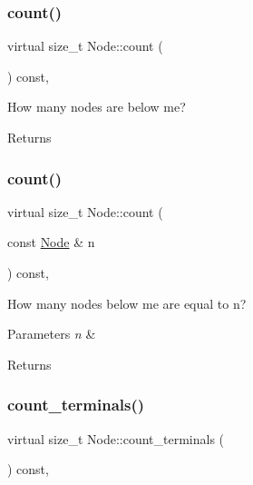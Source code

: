 \subsubsection{\texorpdfstring{count()}{count()}\hspace{0.1cm}{\footnotesize\ttfamily [1/2]}}
{\footnotesize\ttfamily virtual size\+\_\+t Node\+::count (\begin{DoxyParamCaption}{ }\end{DoxyParamCaption}) const\hspace{0.3cm}{\ttfamily [inline]}, {\ttfamily [virtual]}}

How many nodes are below me? \begin{DoxyReturn}{Returns}

\end{DoxyReturn}
\mbox{\label{class_node_a0cc58478d98361566830a8d3db745718}} 
\subsubsection{\texorpdfstring{count()}{count()}\hspace{0.1cm}{\footnotesize\ttfamily [2/2]}}
{\footnotesize\ttfamily virtual size\+\_\+t Node\+::count (\begin{DoxyParamCaption}\item[{const \hyperlink{class_node}{Node} \&}]{n }\end{DoxyParamCaption}) const\hspace{0.3cm}{\ttfamily [inline]}, {\ttfamily [virtual]}}

How many nodes below me are equal to n? 
\begin{DoxyParams}{Parameters}
{\em n} & \\
\hline
\end{DoxyParams}
\begin{DoxyReturn}{Returns}

\end{DoxyReturn}
\mbox{\label{class_node_a70c820eaeaa852e3c0a46cf006026c1b}} 
\subsubsection{\texorpdfstring{count\+\_\+terminals()}{count\_terminals()}}
{\footnotesize\ttfamily virtual size\+\_\+t Node\+::count\+\_\+terminals (\begin{DoxyParamCaption}{ }\end{DoxyParamCaption}) const\hspace{0.3cm}{\ttfamily [inline]}, {\ttfamily [virtual]}}

